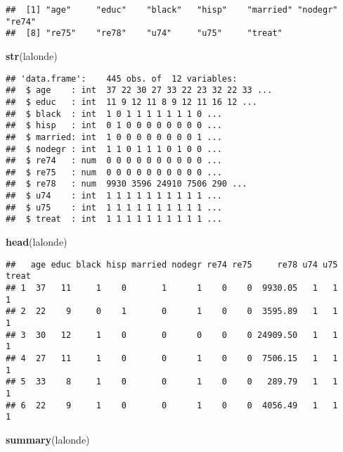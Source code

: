 \documentclass[]{article}
\newenvironment{Shaded}{\begin{snugshade}}{\end{snugshade}}
\newcommand{\KeywordTok}[1]{\textcolor[rgb]{0.13,0.29,0.53}{\textbf{#1}}}
\newcommand{\NormalTok}[1]{#1}
\begin{document}
\begin{verbatim}
##  [1] "age"     "educ"    "black"   "hisp"    "married" "nodegr"  "re74"   
##  [8] "re75"    "re78"    "u74"     "u75"     "treat"
\end{verbatim}

\begin{Shaded}
\begin{Highlighting}[]
\KeywordTok{str}\NormalTok{(lalonde)}
\end{Highlighting}
\end{Shaded}

\begin{verbatim}
## 'data.frame':    445 obs. of  12 variables:
##  $ age    : int  37 22 30 27 33 22 23 32 22 33 ...
##  $ educ   : int  11 9 12 11 8 9 12 11 16 12 ...
##  $ black  : int  1 0 1 1 1 1 1 1 1 0 ...
##  $ hisp   : int  0 1 0 0 0 0 0 0 0 0 ...
##  $ married: int  1 0 0 0 0 0 0 0 0 1 ...
##  $ nodegr : int  1 1 0 1 1 1 0 1 0 0 ...
##  $ re74   : num  0 0 0 0 0 0 0 0 0 0 ...
##  $ re75   : num  0 0 0 0 0 0 0 0 0 0 ...
##  $ re78   : num  9930 3596 24910 7506 290 ...
##  $ u74    : int  1 1 1 1 1 1 1 1 1 1 ...
##  $ u75    : int  1 1 1 1 1 1 1 1 1 1 ...
##  $ treat  : int  1 1 1 1 1 1 1 1 1 1 ...
\end{verbatim}

\begin{Shaded}
\begin{Highlighting}[]
\KeywordTok{head}\NormalTok{(lalonde)}
\end{Highlighting}
\end{Shaded}

\begin{verbatim}
##   age educ black hisp married nodegr re74 re75     re78 u74 u75 treat
## 1  37   11     1    0       1      1    0    0  9930.05   1   1     1
## 2  22    9     0    1       0      1    0    0  3595.89   1   1     1
## 3  30   12     1    0       0      0    0    0 24909.50   1   1     1
## 4  27   11     1    0       0      1    0    0  7506.15   1   1     1
## 5  33    8     1    0       0      1    0    0   289.79   1   1     1
## 6  22    9     1    0       0      1    0    0  4056.49   1   1     1
\end{verbatim}

\begin{Shaded}
\begin{Highlighting}[]
\KeywordTok{summary}\NormalTok{(lalonde)}
\end{Highlighting}
\end{Shaded}
\end{document}
